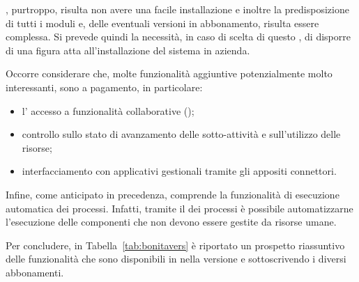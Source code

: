 \progname, purtroppo, risulta non avere una facile installazione e inoltre la predisposizione di tutti i moduli e, delle eventuali versioni in abbonamento, risulta essere complessa. Si prevede quindi la necessità, in caso di scelta di questo \sw, di disporre di una figura atta all'installazione del sistema in azienda. 

Occorre considerare che, molte funzionalità aggiuntive potenzialmente molto interessanti, sono a pagamento, in particolare:
\begin{itemize}
  \item l' accesso a funzionalità collaborative ();
  \item controllo sullo stato di avanzamento delle sotto-attività e sull'utilizzo delle risorse;
  \item interfacciamento con applicativi gestionali  tramite gli appositi connettori.
\end{itemize}

Infine, come anticipato in precedenza, \progname comprende la funzionalità di esecuzione automatica dei processi. Infatti, tramite il  dei processi è possibile automatizzarne l'esecuzione delle componenti che non devono essere gestite da risorse umane.

Per concludere, in Tabella~\ref{tab:bonitavers} è riportato un prospetto riassuntivo delle funzionalità che sono disponibili in \progname nella versione  e sottoscrivendo i diversi abbonamenti.

\clearpage


